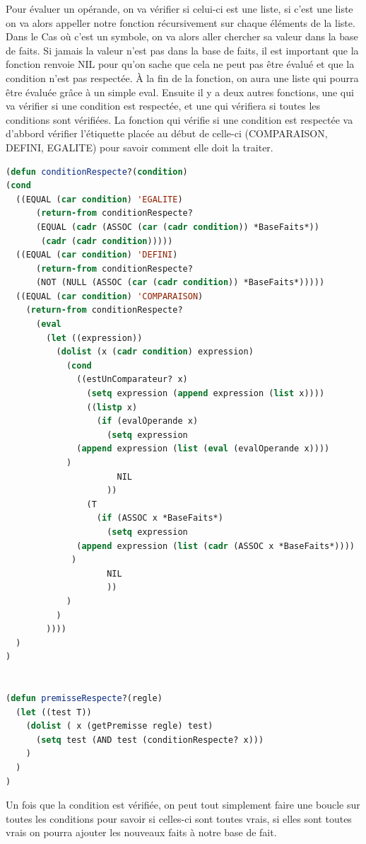 \documentclass[a4paper,10pt]{report}
\begin{document}
    Pour évaluer un opérande, on va vérifier si celui-ci est une liste, si c'est une liste on va alors appeller notre fonction récursivement sur chaque éléments
    de la liste. Dans le Cas où c'est un symbole, on va alors aller chercher sa valeur dans la base de faits. Si jamais la valeur n'est pas dans la base de faits,
    il est important que la fonction renvoie NIL pour qu'on sache que cela ne peut pas être évalué et que la condition n'est pas respectée. À la fin de la fonction,
    on aura une liste qui pourra être évaluée grâce à un simple eval.\newline
    Ensuite il y a deux autres fonctions, une qui va vérifier si une condition est respectée, et une qui vérifiera si toutes les conditions sont vérifiées. La fonction
    qui vérifie si une condition est respectée va d'abbord vérifier l'étiquette placée au début de celle-ci (COMPARAISON, DEFINI, EGALITE) pour savoir comment elle 
    doit la traiter.\newpage
		\begin{lstlisting}[basicstyle = \footnotesize, language=Lisp]
(defun conditionRespecte?(condition)
(cond
  ((EQUAL (car condition) 'EGALITE)
      (return-from conditionRespecte? 
	  (EQUAL (cadr (ASSOC (car (cadr condition)) *BaseFaits*)) 
	   (cadr (cadr condition)))))
  ((EQUAL (car condition) 'DEFINI)
      (return-from conditionRespecte? 
	  (NOT (NULL (ASSOC (car (cadr condition)) *BaseFaits*)))))
  ((EQUAL (car condition) 'COMPARAISON)
    (return-from conditionRespecte?
      (eval
        (let ((expression))
          (dolist (x (cadr condition) expression)
            (cond
              ((estUnComparateur? x)
                (setq expression (append expression (list x))))
                ((listp x)
                  (if (evalOperande x)
                    (setq expression 
		      (append expression (list (eval (evalOperande x))))
		    )
                      NIL
                    ))
                (T
                  (if (ASSOC x *BaseFaits*)
                    (setq expression 
		      (append expression (list (cadr (ASSOC x *BaseFaits*))))
		     )
                    NIL
                    ))
            )
          )
        ))))
  )
)		


(defun premisseRespecte?(regle)
  (let ((test T))
    (dolist ( x (getPremisse regle) test)
      (setq test (AND test (conditionRespecte? x)))
    )
  )
)
		\end{lstlisting}

Un fois que la condition est vérifiée, on peut tout simplement faire une boucle sur toutes les conditions pour savoir si celles-ci sont toutes vrais, si elles sont 
toutes vrais on pourra ajouter les nouveaux faits à notre base de fait.\newpage
\end{document}
